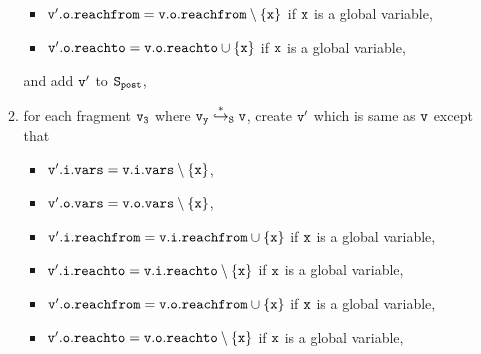 \begin{itemize}
\begin{enumerate}
\begin{itemize}
\item $\tt v'.o.reachfrom = v.o.reachfrom \setminus \{x\}$ if $\tt x$ is a global variable,
\item $\tt v'.o.reachto = v.o.reachto \cup \{x\}$ if $\tt x$ is a global variable,
\end{itemize}
and add $\tt v'$ to $\tt S_{post}$,
\item for each fragment $\tt v_3$ where $\tt v_y \overset{*}\hookrightarrow_S v$, create $\tt v'$ which is same as $\tt v$ except that
\begin{itemize}
\item $\tt v'.i.vars = v.i.vars \setminus \{x\}$,
\item $\tt v'.o.vars = v.o.vars \setminus \{x\}$,
\item $\tt v'.i.reachfrom = v.i.reachfrom \cup \{x\}$ if $\tt x$ is a global variable,
\item $\tt v'.i.reachto = v.i.reachto \setminus \{x\}$ if $\tt x$ is a global variable,

 \item $\tt v'.o.reachfrom = v.o.reachfrom \cup \{x\}$ if $\tt x$ is a global variable,
 \item $\tt v'.o.reachto = v.o.reachto \setminus \{x\}$ if $\tt x$ is a global variable,


\end{itemize}
\end{enumerate}
\end{itemize}
